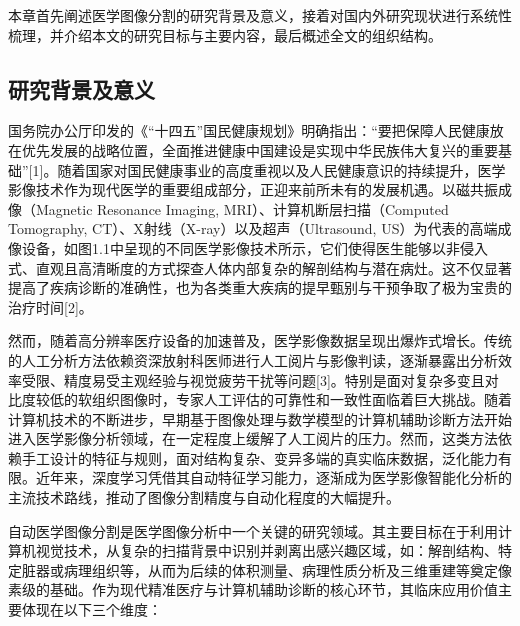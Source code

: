 \documentclass[12pt, a4paper, twoside]{article}
\begin{document}

\begin{center}
    \tableofcontents
\end{center}


本章首先阐述医学图像分割的研究背景及意义，接着对国内外研究现状进行系统性梳理，并介绍本文的研究目标与主要内容，最后概述全文的组织结构。

\subsection{研究背景及意义}

国务院办公厅印发的《“十四五”国民健康规划》明确指出：“要把保障人民健康放在优先发展的战略位置，全面推进健康中国建设是实现中华民族伟大复兴的重要基础”[1]。随着国家对国民健康事业的高度重视以及人民健康意识的持续提升，医学影像技术作为现代医学的重要组成部分，正迎来前所未有的发展机遇。以磁共振成像（Magnetic Resonance Imaging, MRI）、计算机断层扫描（Computed Tomography, CT）、X射线（X-ray）以及超声（Ultrasound, US）为代表的高端成像设备，如图1.1中呈现的不同医学影像技术所示，它们使得医生能够以非侵入式、直观且高清晰度的方式探查人体内部复杂的解剖结构与潜在病灶。这不仅显著提高了疾病诊断的准确性，也为各类重大疾病的提早甄别与干预争取了极为宝贵的治疗时间[2]。

然而，随着高分辨率医疗设备的加速普及，医学影像数据呈现出爆炸式增长。传统的人工分析方法依赖资深放射科医师进行人工阅片与影像判读，逐渐暴露出分析效率受限、精度易受主观经验与视觉疲劳干扰等问题[3]。特别是面对复杂多变且对比度较低的软组织图像时，专家人工评估的可靠性和一致性面临着巨大挑战。随着计算机技术的不断进步，早期基于图像处理与数学模型的计算机辅助诊断方法开始进入医学影像分析领域，在一定程度上缓解了人工阅片的压力。然而，这类方法依赖手工设计的特征与规则，面对结构复杂、变异多端的真实临床数据，泛化能力有限。近年来，深度学习凭借其自动特征学习能力，逐渐成为医学影像智能化分析的主流技术路线，推动了图像分割精度与自动化程度的大幅提升。

自动医学图像分割是医学图像分析中一个关键的研究领域。其主要目标在于利用计算机视觉技术，从复杂的扫描背景中识别并剥离出感兴趣区域，如：解剖结构、特定脏器或病理组织等，从而为后续的体积测量、病理性质分析及三维重建等奠定像素级的基础。作为现代精准医疗与计算机辅助诊断的核心环节，其临床应用价值主要体现在以下三个维度：
\end{document}
